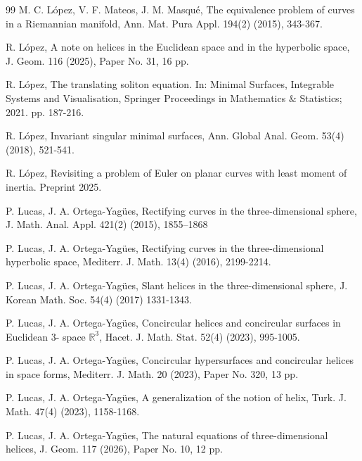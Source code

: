\documentclass[12pt]{amsart}
\def\r{\mathbb R}
\theoremstyle{definition}
\begin{document}
\begin{thebibliography}{99}
 M. C. L\'opez, V. F. Mateos, J. M. Masqu\'e, The equivalence problem of curves in a Riemannian manifold, Ann. Mat. Pura Appl. 194(2) (2015), 343-367.

 R. L\'opez, A note on helices in the Euclidean space and in the hyperbolic space, J. Geom. 116 (2025), Paper No. 31, 16 pp.

 R. L\'opez, The translating soliton equation. In: Minimal Surfaces, Integrable Systems and
Visualisation, Springer Proceedings in Mathematics $\&$ Statistics; 2021. pp. 187-216.

 R. L\'opez, Invariant singular minimal surfaces, Ann. Global Anal. Geom. 53(4) (2018), 521-541.


 R. L\'opez, Revisiting a problem of Euler on planar curves with least moment of
inertia. Preprint 2025.

 P. Lucas, J. A. Ortega-Yag\"ues, Rectifying curves in the three-dimensional sphere, J. Math. Anal. Appl. 421(2) (2015), 1855–1868

 P. Lucas, J. A. Ortega-Yag\"ues, Rectifying curves in the three-dimensional hyperbolic space, Mediterr. J. Math. 13(4) (2016), 2199-2214.

 P. Lucas, J. A. Ortega-Yag\"ues, Slant helices in the three-dimensional sphere, J. Korean Math. Soc. 54(4) (2017) 1331-1343.


 P. Lucas, J. A. Ortega-Yag\"ues, Concircular helices and concircular surfaces in Euclidean 3-
space $\r^3$, Hacet. J. Math. Stat. 52(4) (2023), 995-1005.

 P. Lucas, J. A. Ortega-Yag\"ues, Concircular hypersurfaces and concircular helices in space forms, Mediterr. J. Math. 20 (2023), Paper No. 320, 13 pp.

 P. Lucas, J. A. Ortega-Yag\"ues, A generalization  of the notion of helix, Turk. J. Math. 47(4) (2023), 1158-1168.

 P. Lucas, J. A. Ortega-Yag\"ues, The natural equations of three-dimensional helices, J. Geom. 117 (2026), Paper No. 10, 12 pp.



\end{thebibliography}
\end{document}
